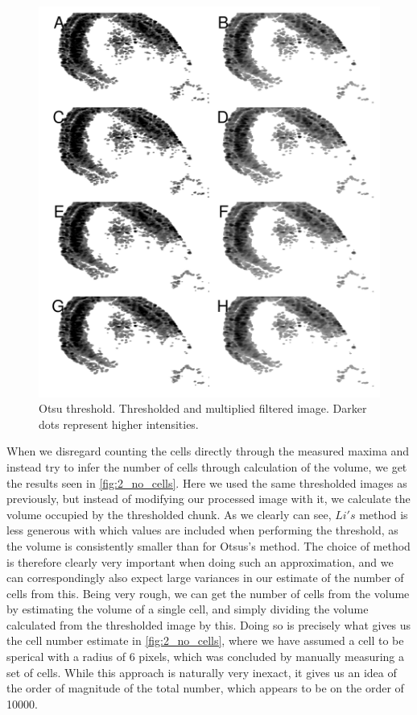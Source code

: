 \documentclass[10pt]{article}
\makeatletter
\def\maxwidth{ %
  \ifdim\Gin@nat@width>\linewidth
    \linewidth
  \else
    \Gin@nat@width
  \fi
}
\theoremstyle{plain}
\makeatother
\begin{document}
\begin{multicols*}{2}
\begin{Schunk}
\begin{figure}[H]
{\centering \includegraphics[width=\maxwidth]{figure/twocolumn-2_threshold_2-1} 

}

\caption[Otsu threshold]{Otsu threshold. Thresholded and multiplied filtered image. Darker dots represent higher intensities.}\label{fig:2_threshold_2}
\end{figure}
\end{Schunk}
\vfill
\newpage

\begin{multicols}{2}
When we disregard counting the cells directly through the measured maxima and instead try to infer the number of cells through calculation of the volume, we get the results seen in \cref{fig:2_no_cells}. Here we used the same thresholded images as previously, but instead of modifying our processed image with it, we calculate the volume occupied by the thresholded chunk. As we clearly can see, $Li's$ method is less generous with which values are included when performing the threshold, as the volume is consistently smaller than for Otsus's method. The choice of method is therefore clearly very important when doing such an approximation, and we can correspondingly also expect large variances in our estimate of the number of cells from this. Being very rough, we can get the number of cells from the volume by estimating the volume of a single cell, and simply dividing the volume calculated from the thresholded image by this. Doing so is precisely what gives us the cell number estimate in \cref{fig:2_no_cells}, where we have assumed a cell to be sperical with a radius of $6$ pixels, which was concluded by manually measuring a set of cells. While this approach is naturally very inexact, it gives us an idea of the order of magnitude of the total number, which appears to be on the order of 10000. 



\end{multicols}
\end{multicols*}
\end{document}
